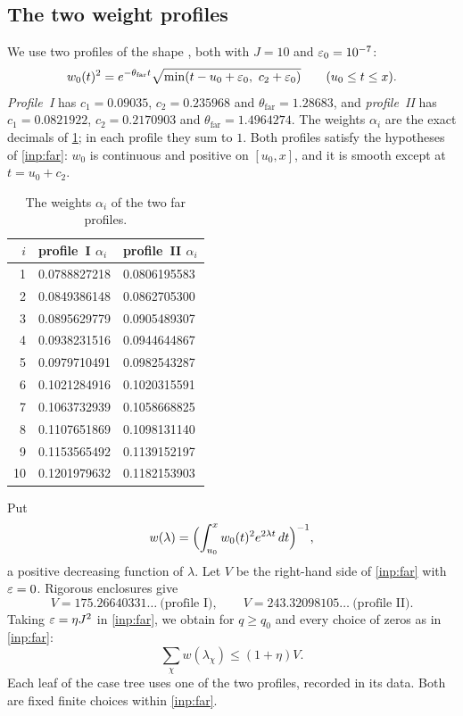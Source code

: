 \subsection{The two weight profiles}
We use two profiles of the shape \cite[(6.20)]{Xylouris2011nullstellen}, both with $J=10$ and
$\varepsilon_0=10^{-7}$:
\[
  w_0(t)^2=e^{-\theta_{\mathrm{far}}t}\sqrt{\min(t-u_0+\eps_0,\ c_2+\eps_0)}\qquad(u_0\le t\le x).
\]
\emph{Profile~I} has $c_1=0.09035$, $c_2=0.235968$ and $\theta_{\mathrm{far}}=1.28683$, and
\emph{profile~II} has $c_1=0.0821922$, $c_2=0.2170903$ and $\theta_{\mathrm{far}}=1.4964274$. The weights
$\alpha_i$ are the exact decimals of \cref{tab:alpha}; in each profile they sum to $1$. Both
profiles satisfy the hypotheses of \cref{inp:far}: $w_0$ is continuous and positive on
$[u_0,x]$, and it is smooth except at $t=u_0+c_2$.

\begin{table}[ht]
\centering
\small
\begin{tabular}{rll}
\toprule
$i$ & profile~I $\alpha_i$ & profile~II $\alpha_i$ \\
\midrule
1 & 0.0788827218 & 0.0806195583 \\
2 & 0.0849386148 & 0.0862705300 \\
3 & 0.0895629779 & 0.0905489307 \\
4 & 0.0938231516 & 0.0944644867 \\
5 & 0.0979710491 & 0.0982543287 \\
6 & 0.1021284916 & 0.1020315591 \\
7 & 0.1063732939 & 0.1058668825 \\
8 & 0.1107651869 & 0.1098131140 \\
9 & 0.1153565492 & 0.1139152197 \\
10 & 0.1201979632 & 0.1182153903 \\
\bottomrule
\end{tabular}
\caption{The weights $\alpha_i$ of the two far profiles.}
\label{tab:alpha}
\end{table}

Put
\[
  w(\lambda)=\Bigl(\int_{u_0}^xw_0(t)^2e^{2\lambda t}\,dt\Bigr)^{-1},
\]
a positive decreasing function of $\lambda$. Let $V$ be the right-hand side of \cref{inp:far}
with $\varepsilon=0$. Rigorous enclosures give
\[
  V=175.26640331\ldots\ \text{(profile I)},\qquad V=243.32098105\ldots\ \text{(profile II)}.
\]
Taking $\varepsilon=\eta J^2$ in \cref{inp:far}, we obtain for $q\ge q_0$ and every choice of zeros as in
\cref{inp:far}:
\begin{equation}\label{eq:farbudget}
  \sum_\chi w(\lambda_\chi)\le(1+\eta)V .
\end{equation}
Each leaf of the case tree uses one of the two profiles, recorded in its data. Both
are fixed finite choices within \cref{inp:far}.

